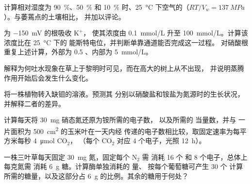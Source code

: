 \begin{exercise}[$\star\star$]\label{exo:b1:plant-water-minerals:6}
计算相对湿度为 \qty{90}{\%}、\qty{50}{\%} 和
\qty{10}{\%} 时、\qty{25}{\celsius} 下空气的（$RT/V_w =
\qty{137}{MPa}$）。与萎蔫点的土壤相比，
并加以评论。
\end{exercise}

\begin{exercise}[$\star\star$]\label{exo:b1:plant-water-minerals:7}
为 \qty{-150}{mV} 的根吸收 $\mathrm{K^+}$，
使其浓度由 \qty{0.1}{mmol/L} 升至 \qty{100}{mmol/L}。计算该浓度比在 \qty{25}{\celsius} 下的
能斯特电位，并判断单靠通道能否完成这一过程。
对硝酸根重复上述计算，外部为 \qty{0.5}{}
、内部为 \qty{5}{mmol/L}。
\end{exercise}

\begin{exercise}[$\star\star$]\label{exo:b1:plant-water-minerals:8}
解释为何吐水现象在草上于黎明时可见，而在高大的树上从不出现，
并说明蒸腾作用开始后会发生什么变化。
\end{exercise}

\begin{exercise}[$\star\star$]\label{exo:b1:plant-water-minerals:9}
将一株植物转入缺钼的溶液。预测其
分别以硝酸盐和铵盐为氮源时的生长状况，并解释二者的差异。
\end{exercise}

\begin{exercise}[$\star\star\star$]\label{exo:b1:plant-water-minerals:10}
计算每天将 \qty{30}{mg} 硝态氮还原为铵所需的电子数，
以及所需的  当量数，并与
一片面积为 \qty{500}{cm^2} 的玉米叶在一天内经
传递的电子数相比较，取固定速率为每平方米每秒 \qty{4}{\micro mol} $\mathrm{CO_2}$，
（每个 $\mathrm{CO_2}$ 对应 4 个电子，光照 \qty{12}{h}）。
\end{exercise}

\begin{exercise}[$\star\star\star$]\label{exo:b1:plant-water-minerals:11}
一株三叶草每天固定 \qty{30}{mg} 氮，固定每个 $\mathrm{N_2}$ 需
消耗 \qty{16}{} 个  和 \qty{8}{} 个电子，总体上每克氮需
消耗 \qty{6}{g} 糖。计算酶单独消耗的  量、
按每个葡萄糖可产生 30 个  计算所需的糖量，以及这部分占
\qty{6}{g} 的比例。其余的糖用于何处？
\end{exercise}

